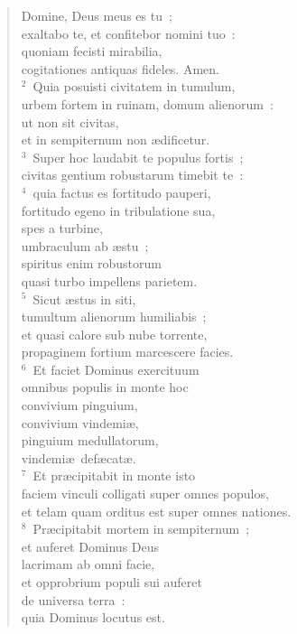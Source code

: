 \begin{flushleft}\begin{verse}\vspace{-19pt}\hspace{6pt}Domine, Deus meus es tu~;\\\hspace{6pt} exaltabo te, et confitebor nomini tuo~:\\ quoniam fecisti mirabilia,\\ cogitationes antiquas fideles. Amen.\\
${}^{2}$~Quia posuisti civitatem in tumulum,\\ urbem fortem in ruinam, domum alienorum~:\\ ut non sit civitas,\\ et in sempiternum non \ae dificetur.\\
${}^{3}$~Super hoc laudabit te populus fortis~;\\ civitas gentium robustarum timebit te~:\\
${}^{4}$~quia factus es fortitudo pauperi,\\ fortitudo egeno in tribulatione sua,\\ spes a turbine,\\ umbraculum ab \ae stu~;\\ spiritus enim robustorum\\ quasi turbo impellens parietem.\\
${}^{5}$~Sicut \ae stus in siti,\\ tumultum alienorum humiliabis~;\\ et quasi calore sub nube torrente,\\ propaginem fortium marcescere facies.\\
${}^{6}$~Et faciet Dominus exercituum\\ omnibus populis in monte hoc\\ convivium pinguium,\\ convivium vindemi\ae ,\\ pinguium medullatorum,\\ vindemi\ae\ def\ae cat\ae .\\
${}^{7}$~Et pr\ae cipitabit in monte isto\\ faciem vinculi colligati super omnes populos,\\ et telam quam orditus est super omnes nationes.\\
${}^{8}$~Pr\ae cipitabit mortem in sempiternum~;\\ et auferet Dominus Deus\\ lacrimam ab omni facie,\\ et opprobrium populi sui auferet\\ de universa terra~:\\ quia Dominus locutus est.\end{verse}\end{flushleft}


